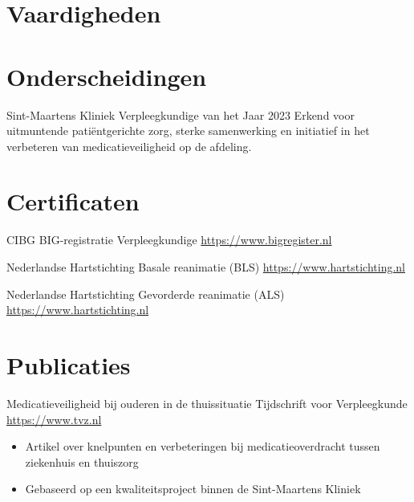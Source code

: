 \documentclass[a4paper, serif, 10pt]{moderncv}
\begin{document}
\section{Vaardigheden}

\section{Onderscheidingen}

        {Sint-Maartens Kliniek}
        {Verpleegkundige van het Jaar 2023}
        {}
        {}
        {Erkend voor uitmuntende patiëntgerichte zorg, sterke samenwerking en initiatief in het verbeteren van medicatieveiligheid op de afdeling.}
\section{Certificaten}

        {CIBG}
        {BIG-registratie Verpleegkundige}
        {\url{https://www.bigregister.nl}}
        {}
        {}

        {Nederlandse Hartstichting}
        {Basale reanimatie (BLS)}
        {\url{https://www.hartstichting.nl}}
        {}
        {}

        {Nederlandse Hartstichting}
        {Gevorderde reanimatie (ALS)}
        {\url{https://www.hartstichting.nl}}
        {}
        {}
\section{Publicaties}

        {Medicatieveiligheid bij ouderen in de thuissituatie}
        {Tijdschrift voor Verpleegkunde}
        {\url{https://www.tvz.nl}}
        {}
        {\begin{itemize}
\item Artikel over knelpunten en verbeteringen bij medicatieoverdracht tussen ziekenhuis en thuiszorg
\item Gebaseerd op een kwaliteitsproject binnen de Sint-Maartens Kliniek
\end{itemize}}
\end{document}
